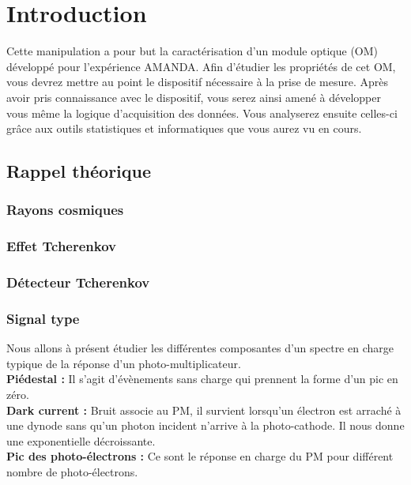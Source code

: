 \section{Introduction}

Cette manipulation a pour but la caract\'erisation d'un module optique (OM) développé pour l'expérience AMANDA. Afin d'étudier les propriétés de cet OM, vous devrez mettre au point le dispositif nécessaire à la prise de mesure. Après avoir pris connaissance avec le dispositif, vous serez ainsi amené à développer vous même la logique d'acquisition des données. Vous analyserez ensuite celles-ci grâce aux outils statistiques et informatiques que vous aurez vu en cours. 

\subsection{Rappel théorique}

\subsubsection{Rayons cosmiques}

\subsubsection{Effet Tcherenkov}

\subsubsection{Détecteur Tcherenkov}


\subsubsection{Signal type}

Nous allons à présent étudier les différentes composantes d'un spectre en charge typique de la réponse d'un photo-multiplicateur.\\

\textbf{Piédestal :} Il s'agit d'évènements sans charge qui prennent la forme d'un pic en zéro.\\

\textbf{Dark current :} Bruit associe au PM, il survient lorsqu'un électron est arraché à une dynode sans qu'un photon incident n'arrive à la photo-cathode. Il nous donne une exponentielle décroissante.\\

\textbf{Pic des photo-électrons :} Ce sont le réponse en charge du PM pour différent nombre de photo-électrons.

